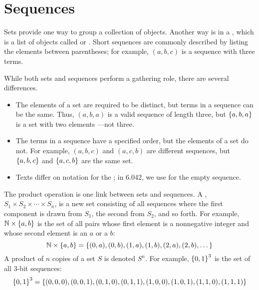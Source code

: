\begin{problems}
\homeworkproblems
{}

\end{problems}

\section{Sequences}

Sets provide one way to group a collection of objects.  Another way is
in a , which is a list of objects called 
or .  Short sequences are commonly described by
listing the elements between parentheses; for example, $(a, b, c)$ is
a sequence with three terms.

While both sets and sequences perform a gathering role, there are
several differences.
\begin{itemize}

\item The elements of a set are required to be distinct, but terms in a
sequence can be the same.  Thus, $(a, b, a)$ is a valid sequence of length
three, but $\left\{a, b, a\right\}$ is a set with two elements ---not three.

\item The terms in a sequence have a specified order, but the elements
of a set do not.  For example, $(a, b, c)$ and $(a, c, b)$ are
different sequences, but $\left\{a, b, c\right\}$ and $\left\{a, c, b\right\}$ are the
same set.

\item Texts differ on notation for the ; in 6.042, we use
  \term{$\lambda$} for the empty sequence.
\end{itemize}

The product operation is one link between sets and sequences.  A
, $S_1 \times S_2 \times \cdots \times S_n$, is a
new set consisting of all sequences where the first component is drawn
from $S_1$, the second from $S_2$, and so forth.  For example, $\mathbb{N}
\times \left\{a,b\right\}$ is the set of all pairs whose first element is a
nonnegative integer and whose second element is an $a$ or a $b$:
\[
\mathbb{N} \times \left\{a,b\right\}
    = \left\{(0,a), (0,b), (1,a), (1,b), (2,a), (2, b), \dots\right\}
\]
A product of $n$ copies of a set $S$ is denoted $S^n$.  For example,
$\left\{0, 1\right\}^3$ is the set of all $3$-bit sequences:
\[
\left\{0, 1\right\}^3 = \left\{ (0,0,0), (0,0,1), (0,1,0), (0,1,1),
                     (1,0,0), (1,0,1), (1,1,0), (1,1,1) \right\}
\]

